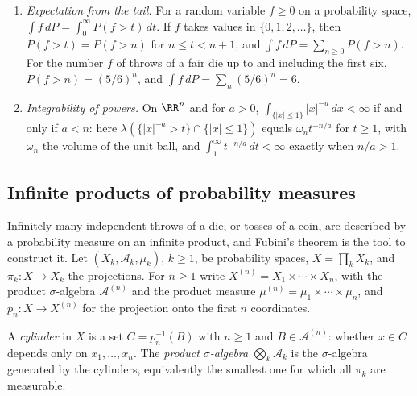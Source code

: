 \begin{example}\label{measure-theory:example-layer-cake}
\begin{enumerate}
\item \emph{Expectation from the tail.} For a random variable $f \geq 0$ on a probability space, $\int f\,dP = \int_0^\infty P(f > t)\,dt$. If $f$ takes values in $\{0, 1, 2, \ldots\}$, then
$P(f > t) = P(f > n)$ for $n \leq t < n + 1$, and $\int f\,dP = \sum_{n \geq 0}P(f > n)$. For the number $f$ of throws of a fair die up to and including the first six,
$P(f > n) = (5/6)^n$, and $\int f\,dP = \sum_n(5/6)^n = 6$.
\item \emph{Integrability of powers.} On $\RR^n$ and for $a > 0$, $\int_{\{|x| \leq 1\}}|x|^{-a}\,dx < \infty$ if and only if $a < n$: here $\lambda(\{|x|^{-a} > t\} \cap \{|x| \leq 1\})$ equals $\omega_nt^{-n/a}$ for $t \geq 1$, with
$\omega_n$ the volume of the unit ball, and $\int_1^\infty t^{-n/a}\,dt < \infty$ exactly when $n/a > 1$.
\end{enumerate}
\end{example}

\subsection{Infinite products of probability measures}\label{measure-theory:subsection-infinite-products}

Infinitely many independent throws of a die, or tosses of a coin, are described by a probability measure on an infinite product, and Fubini's theorem is the tool to construct it. Let
$(X_k, \mathcal{A}_k, \mu_k)$, $k \geq 1$, be probability spaces, $X = \prod_kX_k$, and $\pi_k \colon X \to X_k$ the projections. For $n \geq 1$ write $X^{(n)} = X_1 \times \cdots \times X_n$, with the product
$\sigma$-algebra $\mathcal{A}^{(n)}$ and the product measure $\mu^{(n)} = \mu_1 \times \cdots \times \mu_n$, and $p_n \colon X \to X^{(n)}$ for the projection onto the first $n$ coordinates.

\begin{definition}\label{measure-theory:definition-cylinder}
A \emph{cylinder} in $X$ is a set $C = p_n^{-1}(B)$ with $n \geq 1$ and $B \in \mathcal{A}^{(n)}$: whether $x \in C$ depends only on $x_1, \ldots, x_n$. The \emph{product $\sigma$-algebra}
$\bigotimes_k\mathcal{A}_k$ is the $\sigma$-algebra generated by the cylinders, equivalently the smallest one for which all $\pi_k$ are measurable.
\end{definition}

